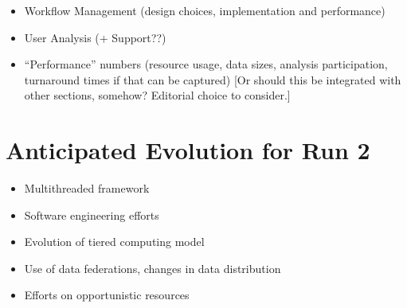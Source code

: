 \documentclass [draft,notitlepage] {article}
\begin{document}
\begin{itemize}
\item Workflow Management (design choices, implementation and performance)


\item User Analysis (+ Support??)

\item ``Performance'' numbers (resource usage, data sizes, analysis participation, turnaround times if that can be captured) [Or should this be integrated with other sections, somehow?  Editorial choice to consider.]
\end{itemize}

\section{Anticipated Evolution for Run 2}
\begin{itemize}
\item Multithreaded framework


\item Software engineering efforts

\item Evolution of tiered computing model

\item Use of data federations, changes in data distribution
\item Efforts on opportunistic resources
\end{itemize}
\end{document}
